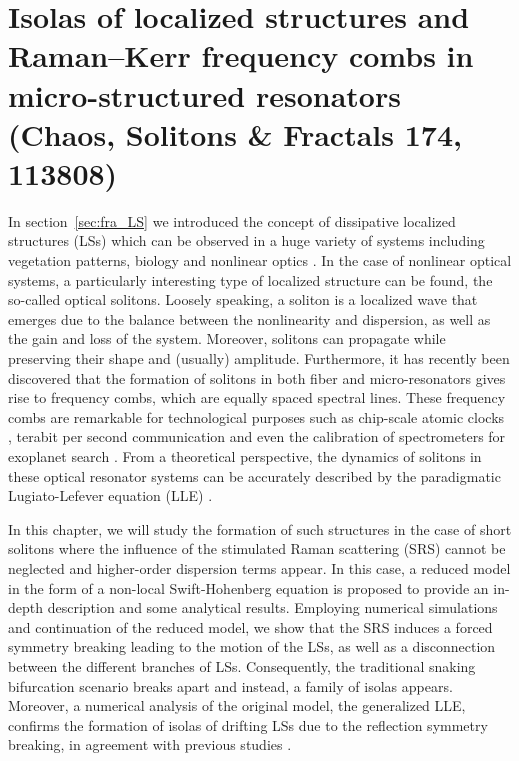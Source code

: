 \chapter{Isolas of localized structures and Raman–Kerr frequency combs in micro-structured resonators (Chaos, Solitons \& Fractals 174, 113808)}

In section~\ref{sec:fra_LS} we introduced the concept of dissipative 
localized structures (LSs) which can be observed in a huge variety
of systems including vegetation patterns, biology and 
nonlinear optics \cite{tlidi2014localized,heimburg2005soliton}. In the case of nonlinear optical systems,
a particularly interesting type of localized structure can be found,
the so-called optical solitons. Loosely speaking, a soliton
is a localized wave that emerges due to the balance between the nonlinearity
and dispersion, as well as the gain and loss of the system. Moreover,
solitons can propagate while preserving their shape and (usually) amplitude.
Furthermore, it has recently been discovered that the formation of solitons
in both fiber and micro-resonators gives rise to frequency combs, which are equally
spaced spectral lines. These frequency combs are remarkable
for technological purposes such as chip-scale atomic clocks \cite{Jost2015clock}, terabit
per second communication \cite{marin2017microresonator} and even the calibration of spectrometers
for exoplanet search \cite{suh2019searching}. From a theoretical perspective, the dynamics
of solitons in these optical resonator systems can be accurately described 
by the paradigmatic Lugiato-Lefever equation (LLE) \cite{lugiatolefever1987}.

In this chapter, we will study the formation of such structures in the
case of short solitons where the influence of the stimulated Raman scattering (SRS)
cannot be neglected and higher-order dispersion terms appear. In this case, a reduced model
in the form of a non-local Swift-Hohenberg equation is proposed to provide an
in-depth description and some analytical results. Employing numerical simulations and
continuation of the reduced model, we show that the SRS induces a forced symmetry
breaking leading to the motion of the LSs, as well as a disconnection between the different
branches of LSs. Consequently, the traditional snaking bifurcation scenario breaks
apart and instead, a family of isolas appears. Moreover, a numerical analysis of the
original model, the generalized LLE, confirms the formation of isolas of drifting LSs due
to the reflection symmetry breaking, in agreement with previous studies \cite{burke2009swift,parra2014third}.
